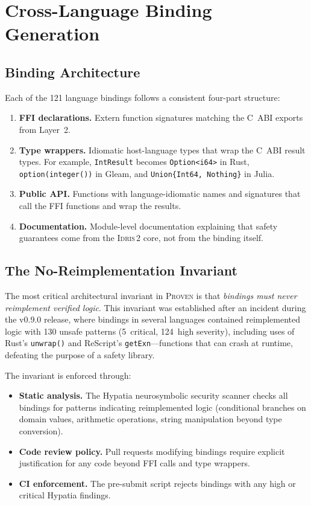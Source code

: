 \documentclass[11pt,a4paper]{article}
\newcommand{\proven}{\textsc{Proven}}
\newcommand{\idris}{\textsc{Idris\,2}}
\newcommand{\code}[1]{\texttt{#1}}
\begin{document}
\section{Cross-Language Binding Generation}
\label{sec:bindings}

\subsection{Binding Architecture}

Each of the 121 language bindings follows a consistent four-part structure:

\begin{enumerate}[nosep]
  \item \textbf{FFI declarations.} Extern function signatures matching the
    C~ABI exports from Layer~2.
  \item \textbf{Type wrappers.} Idiomatic host-language types that wrap the
    C~ABI result types. For example, \code{IntResult} becomes
    \code{Option<i64>} in Rust, \code{option(integer())} in Gleam, and
    \code{Union\{Int64, Nothing\}} in Julia.
  \item \textbf{Public API.} Functions with language-idiomatic names and
    signatures that call the FFI functions and wrap the results.
  \item \textbf{Documentation.} Module-level documentation explaining that
    safety guarantees come from the \idris{} core, not from the binding
    itself.
\end{enumerate}

\subsection{The No-Reimplementation Invariant}
\label{sec:no-reimplement}

The most critical architectural invariant in \proven{} is that
\emph{bindings must never reimplement verified logic}. This invariant was
established after an incident during the v0.9.0 release, where bindings
in several languages contained reimplemented logic with 130 unsafe
patterns (5~critical, 124~high severity), including uses of Rust's
\code{unwrap()} and ReScript's \code{getExn}---functions that can
crash at runtime, defeating the purpose of a safety library.

The invariant is enforced through:

\begin{itemize}[nosep]
  \item \textbf{Static analysis.} The Hypatia neurosymbolic security
    scanner checks all bindings for patterns indicating reimplemented
    logic (conditional branches on domain values, arithmetic operations,
    string manipulation beyond type conversion).
  \item \textbf{Code review policy.} Pull requests modifying bindings
    require explicit justification for any code beyond FFI calls and type
    wrappers.
  \item \textbf{CI enforcement.} The pre-submit script rejects bindings
    with any high or critical Hypatia findings.
\end{itemize}
\end{document}
